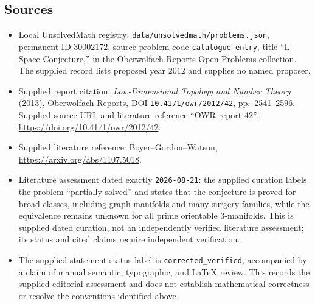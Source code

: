 \documentclass[11pt]{article}
\begin{document}
\subsection{Sources}
\begin{itemize}
\item Local UnsolvedMath registry: \texttt{data/unsolvedmath/problems.json}, permanent ID \(30002172\), source problem code \texttt{catalogue entry}, title ``L-Space Conjecture,'' in the Oberwolfach Reports Open Problems collection. The supplied record lists proposed year \(2012\) and supplies no named proposer.
\item Supplied report citation: \emph{Low-Dimensional Topology and Number Theory} (2013), Oberwolfach Reports, DOI \texttt{10.4171/owr/2012/42}, pp.\ 2541--2596. Supplied source URL and literature reference ``OWR report 42'': \url{https://doi.org/10.4171/owr/2012/42}.
\item Supplied literature reference: Boyer--Gordon--Watson, \url{https://arxiv.org/abs/1107.5018}.
\item Literature assessment dated exactly \texttt{2026-08-21}: the supplied curation labels the problem ``partially solved'' and states that the conjecture is proved for broad classes, including graph manifolds and many surgery families, while the equivalence remains unknown for all prime orientable \(3\)-manifolds. This is supplied dated curation, not an independently verified literature assessment; its status and cited claims require independent verification.
\item The supplied statement-status label is \texttt{corrected\_verified}, accompanied by a claim of manual semantic, typographic, and LaTeX review. This records the supplied editorial assessment and does not establish mathematical correctness or resolve the conventions identified above.
\end{itemize}
\end{document}
